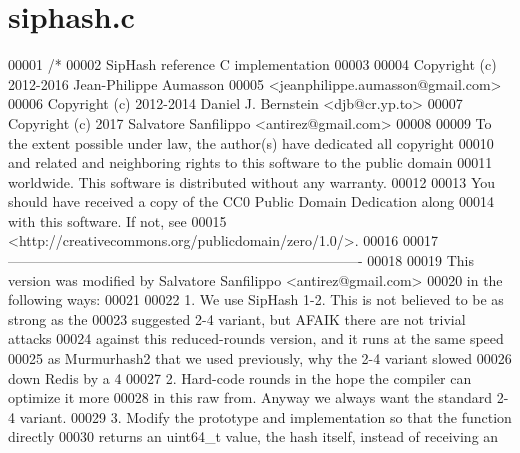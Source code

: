 \hypertarget{siphash_8c_source}{}\section{siphash.\+c}
\label{siphash_8c_source}

\begin{DoxyCode}
00001 \textcolor{comment}{/*}
00002 \textcolor{comment}{   SipHash reference C implementation}
00003 \textcolor{comment}{}
00004 \textcolor{comment}{   Copyright (c) 2012-2016 Jean-Philippe Aumasson}
00005 \textcolor{comment}{   <jeanphilippe.aumasson@gmail.com>}
00006 \textcolor{comment}{   Copyright (c) 2012-2014 Daniel J. Bernstein <djb@cr.yp.to>}
00007 \textcolor{comment}{   Copyright (c) 2017 Salvatore Sanfilippo <antirez@gmail.com>}
00008 \textcolor{comment}{}
00009 \textcolor{comment}{   To the extent possible under law, the author(s) have dedicated all copyright}
00010 \textcolor{comment}{   and related and neighboring rights to this software to the public domain}
00011 \textcolor{comment}{   worldwide. This software is distributed without any warranty.}
00012 \textcolor{comment}{}
00013 \textcolor{comment}{   You should have received a copy of the CC0 Public Domain Dedication along}
00014 \textcolor{comment}{   with this software. If not, see}
00015 \textcolor{comment}{   <http://creativecommons.org/publicdomain/zero/1.0/>.}
00016 \textcolor{comment}{}
00017 \textcolor{comment}{   ----------------------------------------------------------------------------}
00018 \textcolor{comment}{}
00019 \textcolor{comment}{   This version was modified by Salvatore Sanfilippo <antirez@gmail.com>}
00020 \textcolor{comment}{   in the following ways:}
00021 \textcolor{comment}{}
00022 \textcolor{comment}{   1. We use SipHash 1-2. This is not believed to be as strong as the}
00023 \textcolor{comment}{      suggested 2-4 variant, but AFAIK there are not trivial attacks}
00024 \textcolor{comment}{      against this reduced-rounds version, and it runs at the same speed}
00025 \textcolor{comment}{      as Murmurhash2 that we used previously, why the 2-4 variant slowed}
00026 \textcolor{comment}{      down Redis by a 4%
00027 \textcolor{comment}{   2. Hard-code rounds in the hope the compiler can optimize it more}
00028 \textcolor{comment}{      in this raw from. Anyway we always want the standard 2-4 variant.}
00029 \textcolor{comment}{   3. Modify the prototype and implementation so that the function directly}
00030 \textcolor{comment}{      returns an uint64\_t value, the hash itself, instead of receiving an}
}
\end{DoxyCode}
